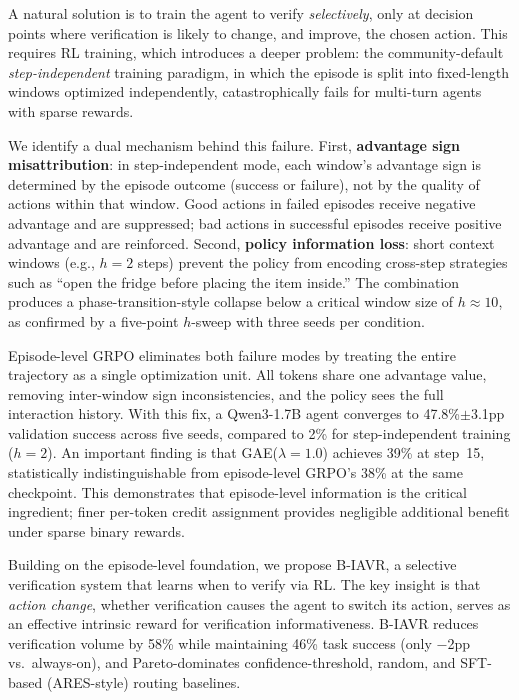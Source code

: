 \documentclass[10pt]{article}
\newcommand{\ours}{B-IAVR}
\begin{document}
A natural solution is to train the agent to verify \emph{selectively}, only at decision points where verification is likely to change, and improve, the chosen action. This requires RL training, which introduces a deeper problem: the community-default \emph{step-independent} training paradigm, in which the episode is split into fixed-length windows optimized independently, catastrophically fails for multi-turn agents with sparse rewards.

We identify a dual mechanism behind this failure. First, \textbf{advantage sign misattribution}: in step-independent mode, each window's advantage sign is determined by the episode outcome (success or failure), not by the quality of actions within that window. Good actions in failed episodes receive negative advantage and are suppressed; bad actions in successful episodes receive positive advantage and are reinforced. Second, \textbf{policy information loss}: short context windows (e.g., $h{=}2$ steps) prevent the policy from encoding cross-step strategies such as ``open the fridge before placing the item inside.'' The combination produces a phase-transition-style collapse below a critical window size of $h{\approx}10$, as confirmed by a five-point $h$-sweep with three seeds per condition.

Episode-level GRPO eliminates both failure modes by treating the entire trajectory as a single optimization unit. All tokens share one advantage value, removing inter-window sign inconsistencies, and the policy sees the full interaction history. With this fix, a Qwen3-1.7B agent converges to 47.8\%$\pm$3.1pp validation success across five seeds, compared to 2\% for step-independent training ($h{=}2$). An important finding is that GAE($\lambda{=}1.0$) achieves 39\% at step~15, statistically indistinguishable from episode-level GRPO's 38\% at the same checkpoint. This demonstrates that episode-level information is the critical ingredient; finer per-token credit assignment provides negligible additional benefit under sparse binary rewards.

Building on the episode-level foundation, we propose \ours{}, a selective verification system that learns when to verify via RL. The key insight is that \emph{action change}, whether verification causes the agent to switch its action, serves as an effective intrinsic reward for verification informativeness. \ours{} reduces verification volume by 58\% while maintaining 46\% task success (only $-$2pp vs.\ always-on), and Pareto-dominates confidence-threshold, random, and SFT-based (ARES-style) routing baselines.
\end{document}
